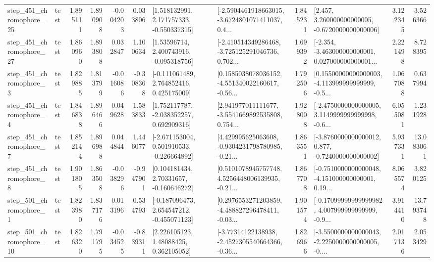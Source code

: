 \begin{tabular}{llrrrrllrlrr}
  step\_451\_chromophore\_25 &      test &      1.895111 &    1.890908 &     -0.004203 &  0.033806 &    [1.518132991, 2.171757333, -0.550337315] &  [-2.5904461918663015, -3.6724801071411037, 0.4... &       1.845231 &    [2.457, 3.260000000000005, -0.6720000000000006] &            3.122345 &          3.526366 \\
  step\_451\_chromophore\_27 &      test &      1.860960 &    1.893808 &      0.032847 &  1.100634 &     [1.53596714, 2.400743916, -0.095318756] &  [-2.410514349286468, -3.725125291046736, 0.702... &       1.699392 &  [-2.354, -3.463000000000001, 0.027000000000001... &            2.221498 &          8.728395 \\
   step\_451\_chromophore\_3 &      test &      1.829885 &    1.813799 &     -0.016086 & -0.308368 &    [-0.111061489, 2.764852416, 0.425175009] &  [0.1585038078036152, -4.551340022160617, -0.56... &       1.792506 &  [0.15500000000000003, -4.113999999999999, -0.5... &            1.067088 &          0.637994 \\
   step\_451\_chromophore\_4 &      test &      1.846838 &    1.896466 &      0.049628 &  1.583833 &    [1.752117787, -2.038352257, 0.692909316] &  [2.941977011111677, -3.5541669892535808, 0.754... &       1.928008 &  [-2.4750000000000005, 3.1149999999999998, -0.6... &            6.055081 &          1.231928 \\
   step\_451\_chromophore\_7 &      test &      1.852144 &    1.896988 &      0.044844 &  1.446077 &   [-2.671153004, 0.501910533, -0.226664892] &  [4.429995625063608, -0.9304231798780985, -0.21... &       1.863551 &  [-3.8760000000000012, 0.877, -0.7240000000000002] &            5.937331 &         13.083061 \\
   step\_451\_chromophore\_8 &      test &      1.901805 &    1.863508 &     -0.038296 & -0.947901 &     [0.104181434, 2.70331657, -0.160646272] &  [0.5101078945757748, 4.5256448006139935, -0.21... &       1.867708 &  [-0.7510000000000048, -4.151000000000001, 0.19... &            8.065574 &          3.820125 \\
   step\_501\_chromophore\_1 &      test &      1.823980 &    1.837176 &      0.013196 &  0.534793 &   [-0.187096473, 2.654547212, -0.455071123] &  [0.2976553271203859, -4.488827296478411, -0.03... &       1.901574 &  [-0.17099999999999982, 4.007999999999999, -0.9... &            3.914410 &         13.793748 \\
  step\_501\_chromophore\_10 &      test &      1.826320 &    1.791795 &     -0.034525 & -0.839311 &      [2.226105123, 1.48088425, 0.362105052] &  [-3.77314122138938, -2.4527305540664366, -0.36... &       1.826966 &  [-3.5500000000000043, -2.2250000000000005, -0.... &            2.017136 &          2.053429 \\

\end{tabular}
